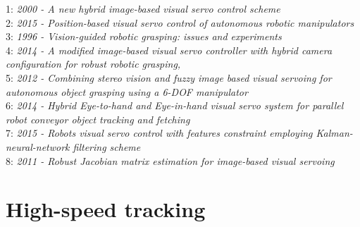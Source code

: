 1: \textit{2000 - A new hybrid image-based visual servo control scheme} \\
2: \textit{2015 - Position-based visual servo control of autonomous robotic manipulators} \\
3: \textit{1996 - Vision-guided robotic grasping: issues and experiments} \\
4: \textit{2014 - A modified image-based visual servo controller with hybrid camera configuration for robust robotic grasping,} \\
5: \textit{2012 - Combining stereo vision and fuzzy image based visual servoing for autonomous object grasping using a 6-DOF manipulator} \\
6: \textit{2014 - Hybrid Eye-to-hand and Eye-in-hand visual servo system for parallel robot conveyor object tracking and fetching} \\
7: \textit{2015 - Robots visual servo control with features constraint employing Kalman-neural-network filtering scheme} \\
8: \textit{2011 - Robust Jacobian matrix estimation for image-based
visual servoing}


\section{High-speed tracking}
